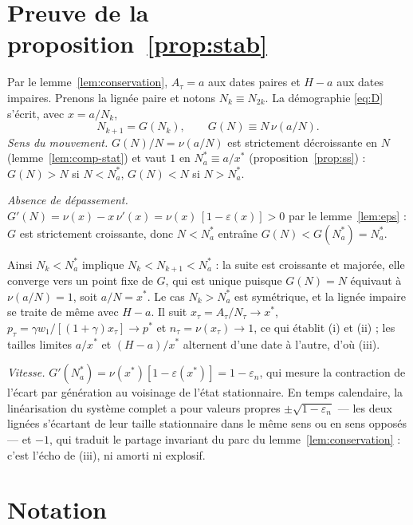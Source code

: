 \documentclass[11pt,a4paper]{article}
\theoremstyle{plain}
\theoremstyle{definition}
\newcommand{\eps}{\varepsilon}
\begin{document}
\appendix
\section{Preuve de la proposition~\ref{prop:stab}}\label{app:stab}

Par le lemme~\ref{lem:conservation}, $A_\tau = a$ aux dates paires et $H-a$ aux dates impaires. Prenons la lignée paire et notons $N_k \equiv N_{2k}$. La démographie \eqref{eq:D} s'écrit, avec $x = a/N_k$,
\[
N_{k+1} = G(N_k), \qquad G(N) \equiv N\,\nu(a/N) .
\]
\emph{Sens du mouvement.} $G(N)/N = \nu(a/N)$ est strictement décroissante en $N$ (lemme~\ref{lem:comp-stat}) et vaut $1$ en $N_a^* \equiv a/x^*$ (proposition~\ref{prop:ss}) : $G(N) > N$ si $N < N_a^*$, $G(N) < N$ si $N > N_a^*$.

\emph{Absence de dépassement.} $G'(N) = \nu(x) - x\,\nu'(x) = \nu(x)\,[1-\eps(x)] > 0$ par le lemme~\ref{lem:eps} : $G$ est strictement croissante, donc $N < N_a^*$ entraîne $G(N) < G(N_a^*) = N_a^*$.

Ainsi $N_k < N_a^*$ implique $N_k < N_{k+1} < N_a^*$ : la suite est croissante et majorée, elle converge vers un point fixe de $G$, qui est unique puisque $G(N) = N$ équivaut à $\nu(a/N) = 1$, soit $a/N = x^*$. Le cas $N_k > N_a^*$ est symétrique, et la lignée impaire se traite de même avec $H-a$. Il suit $x_\tau = A_\tau/N_\tau \to x^*$, $p_\tau = \gamma w_1/[(1+\gamma)x_\tau] \to p^*$ et $n_\tau = \nu(x_\tau) \to 1$, ce qui établit (i) et (ii) ; les tailles limites $a/x^*$ et $(H-a)/x^*$ alternent d'une date à l'autre, d'où (iii).

\emph{Vitesse.} $G'(N_a^*) = \nu(x^*)[1-\eps(x^*)] = 1-\eps_n$, qui mesure la contraction de l'écart par génération au voisinage de l'état stationnaire. En temps calendaire, la linéarisation du système complet a pour valeurs propres $\pm\sqrt{1-\eps_n}$ — les deux lignées s'écartant de leur taille stationnaire dans le même sens ou en sens opposés — et $-1$, qui traduit le partage invariant du parc du lemme~\ref{lem:conservation} : c'est l'écho de (iii), ni amorti ni explosif.

\section{Notation}
\end{document}
